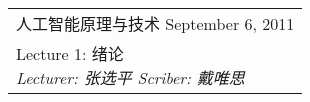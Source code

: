 \def\lecture{1}
\clearpage \noindent\begin{tabularx}{\linewidth}{|X|}
\hline \vskip -2mm
{\sf 人工智能原理与技术} \hfill September 6, 2011 \\
{\centering \sf \large Lecture \lecture:
绪论 \\ }
\textsl{Lecturer: 张选平 \hfill Scriber: 戴唯思}\\ \hline
\end{tabularx}
\setcounter{section}{0}
\renewcommand{\thepage}{\lecture -\arabic{page}}

